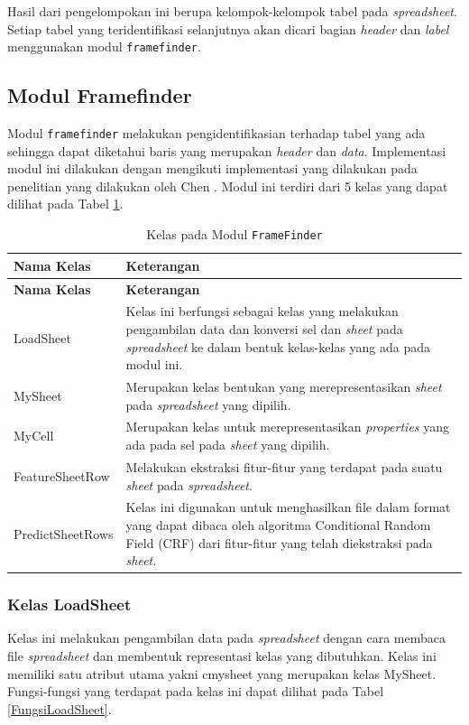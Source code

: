	Hasil dari pengelompokan ini berupa kelompok-kelompok tabel pada \textit{spreadsheet}. Setiap tabel yang teridentifikasi selanjutnya akan dicari bagian \textit{header} dan \textit{label} menggunakan modul \texttt{framefinder}.

	\subsection{Modul Framefinder}
	Modul \texttt{framefinder} melakukan pengidentifikasian terhadap tabel yang ada sehingga dapat diketahui baris yang merupakan \textit{header} dan \textit{data}. Implementasi modul ini dilakukan dengan mengikuti implementasi yang dilakukan pada penelitian yang dilakukan oleh Chen \citep{Chen2013}. Modul ini terdiri dari 5 kelas yang dapat dilihat pada Tabel \ref{KelasModulFF}.

	\begin{small}
	\begin{longtable}{ | p{3cm} | p{10cm} | }
	    \caption{Kelas pada Modul \texttt{FrameFinder}}
	    \label{KelasModulFF}\\ \hline
	    \centering\bfseries{Nama Kelas} & \centering\bfseries{Keterangan} \tabularnewline \hline
	    \endfirsthead
	    \hline
	    \centering\bfseries{Nama Kelas} & \centering\bfseries{Keterangan} \tabularnewline \hline
	    \endhead
	    LoadSheet & Kelas ini berfungsi sebagai kelas yang melakukan pengambilan data dan konversi sel dan \textit{sheet} pada \textit{spreadsheet} ke dalam bentuk kelas-kelas yang ada pada modul ini.\\ \hline
	    MySheet & Merupakan kelas bentukan yang merepresentasikan \textit{sheet} pada \textit{spreadsheet} yang dipilih.\\ \hline
	    MyCell & Merupakan kelas untuk merepresentasikan \textit{properties} yang ada pada sel pada \textit{sheet} yang dipilih.\\ \hline
	    FeatureSheetRow & Melakukan ekstraksi fitur-fitur yang terdapat pada suatu \textit{sheet} pada \textit{spreadsheet}.\\ \hline
	    PredictSheetRows & Kelas ini digunakan untuk menghasilkan file dalam format yang dapat dibaca oleh algoritma Conditional Random Field (CRF) dari fitur-fitur yang telah diekstraksi pada \textit{sheet}.\\ \hline
	\end{longtable}
	\end{small}

	\subsubsection{Kelas LoadSheet}
	Kelas ini melakukan pengambilan data pada \textit{spreadsheet} dengan cara membaca file \textit{spreadsheet} dan membentuk representasi kelas yang dibutuhkan. Kelas ini memiliki satu atribut utama yakni cmysheet yang merupakan kelas MySheet. Fungsi-fungsi yang terdapat pada kelas ini dapat dilihat pada Tabel \ref{FungsiLoadSheet}.

